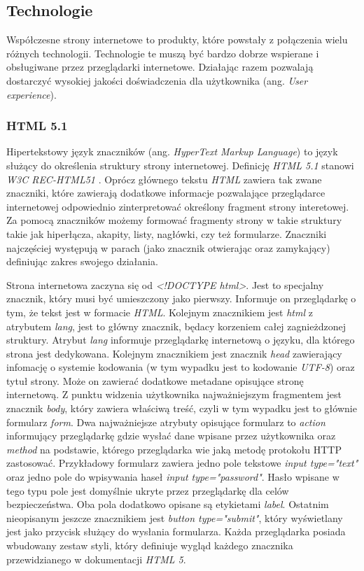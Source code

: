 \documentclass[polish, twoside, 12pt]{mwart}
\begin{document}
\subsection{Technologie}

Współczesne strony internetowe to produkty, które powstały z połączenia wielu różnych technologii. Technologie te muszą być bardzo dobrze wspierane i obsługiwane przez przeglądarki internetowe. Działając razem pozwalają dostarczyć wysokiej jakości doświadczenia dla użytkownika (ang. \emph{User experience}). 

\subsubsection{HTML 5.1} \label{html}

Hipertekstowy język znaczników (ang. \emph{HyperText Markup Language}) to język służący do określenia struktury strony internetowej. Definicję \emph{HTML 5.1} stanowi \emph{W3C REC-HTML51} \cite{w3c-rec-html51}. Oprócz głównego tekstu \emph{HTML} zawiera tak zwane znaczniki, które zawierają dodatkowe informacje pozwalające przeglądarce internetowej odpowiednio zinterpretować określony fragment strony interetowej. Za pomocą znaczników możemy formować fragmenty strony w takie struktury takie jak hiperłącza, akapity, listy, nagłówki, czy też formularze. Znaczniki najczęściej występują w parach (jako znacznik otwierając oraz zamykający) definiując zakres swojego działania.



Strona internetowa zaczyna się od \emph{<!DOCTYPE html>}. Jest to specjalny znacznik, który musi być umieszczony jako pierwszy. Informuje on przeglądarkę o tym, że tekst jest w formacie \emph{HTML}. Kolejnym znacznikiem jest \emph{html} z atrybutem \emph{lang}, jest to główny znacznik, będacy korzeniem całej zagnieżdzonej struktury. Atrybut \emph{lang} informuje przeglądarkę internetową o języku, dla którego strona jest dedykowana. Kolejnym znacznikiem jest znacznik \emph{head} zawierający infomację o systemie kodowania (w tym wypadku jest to  kodowanie \emph{UTF-8}) oraz tytuł strony. Może on zawierać dodatkowe metadane opisujące stronę internetową. Z punktu widzenia użytkownika najważniejszym fragmentem jest znacznik \emph{body}, który zawiera właściwą treść, czyli w tym wypadku jest to głównie formularz \emph{form}. Dwa najważniejsze atrybuty opisujące formularz to \emph{action} informujący przeglądarkę gdzie wysłać dane wpisane przez użytkownika oraz \emph{method} na podstawie, którego przeglądarka wie jaką metodę protokołu HTTP zastosować. Przykładowy formularz zawiera jedno pole tekstowe \emph{input type="text"} oraz jedno pole do wpisywania haseł \emph{input type="password"}. Hasło wpisane w tego typu pole jest domyślnie ukryte przez przeglądarkę dla celów bezpieczeństwa. Oba pola dodatkowo opisane są etykietami \emph{label}. Ostatnim nieopisanym jeszcze znacznikiem jest \emph{button type="submit"}, który wyświetlany jest jako przycisk służący do wysłania formularza. Każda przeglądarka posiada wbudowany zestaw styli, który definiuje wygląd każdego znacznika przewidzianego w dokumentacji \emph{HTML 5}.
\end{document}
